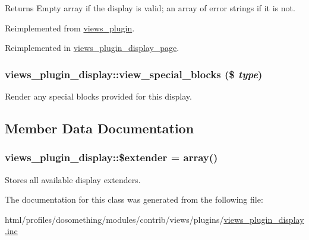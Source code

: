 \begin{DoxyReturn}{Returns}
Empty array if the display is valid; an array of error strings if it is not. 
\end{DoxyReturn}


Reimplemented from \hyperlink{classviews__plugin_aaf004b6a719837f08a1ffe4a1cf4d442}{views\_\-plugin}.

Reimplemented in \hyperlink{classviews__plugin__display__page_a995cf48d67e20ef897d931fcbba391d1}{views\_\-plugin\_\-display\_\-page}.\hypertarget{classviews__plugin__display_a580af377b7d46013594e518c1d31534b}{
\subsubsection[{view\_\-special\_\-blocks}]{\setlength{\rightskip}{0pt plus 5cm}views\_\-plugin\_\-display::view\_\-special\_\-blocks (\$ {\em type})}}
\label{classviews__plugin__display_a580af377b7d46013594e518c1d31534b}
Render any special blocks provided for this display. 

\subsection{Member Data Documentation}
\hypertarget{classviews__plugin__display_afd824fc8476a1f6a916a99e4dbd975ca}{
\subsubsection[{\$extender}]{\setlength{\rightskip}{0pt plus 5cm}views\_\-plugin\_\-display::\$extender = array()}}
\label{classviews__plugin__display_afd824fc8476a1f6a916a99e4dbd975ca}
Stores all available display extenders. 

The documentation for this class was generated from the following file:\begin{DoxyCompactItemize}
\item 
html/profiles/dosomething/modules/contrib/views/plugins/\hyperlink{views__plugin__display_8inc}{views\_\-plugin\_\-display.inc}\end{DoxyCompactItemize}
